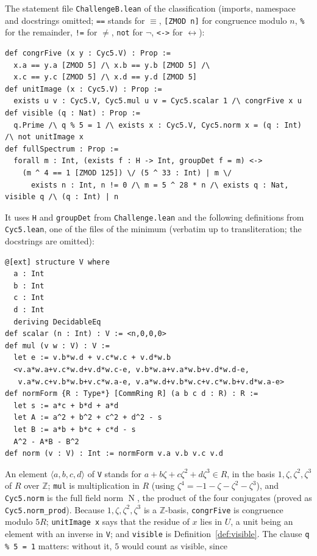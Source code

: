 \documentclass[11pt]{article}
\theoremstyle{definition}
\theoremstyle{remark}
\newcommand{\Z}{\mathbb Z}
\newcommand{\N}{\operatorname{N}}
\begin{document}
{The statement file \texttt{ChallengeB.lean} of the classification (imports,
namespace and docstrings omitted; \texttt{==} stands for $\equiv$,
\texttt{[ZMOD n]} for congruence modulo $n$, \texttt{\%} for the remainder,
\texttt{!=} for $\ne$, \texttt{not} for $\neg$, \texttt{<->} for
$\leftrightarrow$):
{\footnotesize
\begin{verbatim}
def congrFive (x y : Cyc5.V) : Prop :=
  x.a == y.a [ZMOD 5] /\ x.b == y.b [ZMOD 5] /\
  x.c == y.c [ZMOD 5] /\ x.d == y.d [ZMOD 5]
def unitImage (x : Cyc5.V) : Prop :=
  exists u v : Cyc5.V, Cyc5.mul u v = Cyc5.scalar 1 /\ congrFive x u
def visible (q : Nat) : Prop :=
  q.Prime /\ q % 5 = 1 /\ exists x : Cyc5.V, Cyc5.norm x = (q : Int) /\ not unitImage x
def fullSpectrum : Prop :=
  forall m : Int, (exists f : H -> Int, groupDet f = m) <->
    (m ^ 4 == 1 [ZMOD 125]) \/ (5 ^ 33 : Int) | m \/
      exists n : Int, n != 0 /\ m = 5 ^ 28 * n /\ exists q : Nat, visible q /\ (q : Int) | n
\end{verbatim}}
\noindent It uses \texttt{H} and \texttt{groupDet} from \texttt{Challenge.lean}
and the following definitions from \texttt{Cyc5.lean}, one of the files of the
minimum (verbatim up to transliteration; the docstrings are omitted):
{\footnotesize
\begin{verbatim}
@[ext] structure V where
  a : Int
  b : Int
  c : Int
  d : Int
  deriving DecidableEq
def scalar (n : Int) : V := <n,0,0,0>
def mul (v w : V) : V :=
  let e := v.b*w.d + v.c*w.c + v.d*w.b
  <v.a*w.a+v.c*w.d+v.d*w.c-e, v.b*w.a+v.a*w.b+v.d*w.d-e,
   v.a*w.c+v.b*w.b+v.c*w.a-e, v.a*w.d+v.b*w.c+v.c*w.b+v.d*w.a-e>
def normForm {R : Type*} [CommRing R] (a b c d : R) : R :=
  let s := a*c + b*d + a*d
  let A := a^2 + b^2 + c^2 + d^2 - s
  let B := a*b + b*c + c*d - s
  A^2 - A*B - B^2
def norm (v : V) : Int := normForm v.a v.b v.c v.d
\end{verbatim}}
\noindent An element $\langle a,b,c,d\rangle$ of \texttt{V} stands for
$a+b\zeta+c\zeta^2+d\zeta^3\in R$, in the basis $1,\zeta,\zeta^2,\zeta^3$ of
$R$ over $\Z$; \texttt{mul} is multiplication in $R$ (using
$\zeta^4=-1-\zeta-\zeta^2-\zeta^3$), and \texttt{Cyc5.norm} is the full field
norm $\N$, the product of the four conjugates (proved as
\texttt{Cyc5.norm\_prod}). Because $1,\zeta,\zeta^2,\zeta^3$ is a $\Z$-basis,
\texttt{congrFive} is congruence modulo $5R$; \texttt{unitImage x} says that
the residue of $x$ lies in $U$, a unit being an element with an inverse in
\texttt{V}; and \texttt{visible} is Definition~\ref{def:visible}. The clause
\texttt{q \% 5 = 1} matters: without it, $5$ would count as visible, since
}
\end{document}
